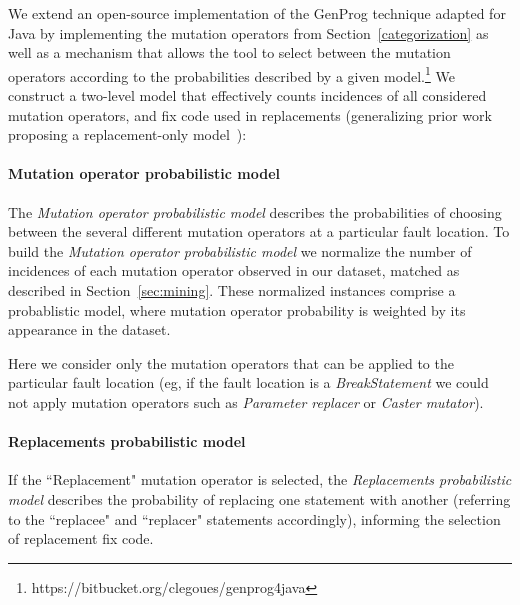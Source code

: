 \documentclass[conference]{IEEEtran}
\begin{document}
We extend an open-source implementation of the GenProg technique adapted for Java
by implementing the mutation operators from
Section~\ref{categorization} as well as a mechanism that allows the tool to
select between the mutation operators according to the probabilities described by
a given model.\footnote{https://bitbucket.org/clegoues/genprog4java}  We construct a two-level model that effectively counts incidences of all considered
mutation operators, and fix code used in replacements  (generalizing prior work
proposing a replacement-only model~\cite{Soto15}):

\paragraph{Mutation operator probabilistic model}
The \textit{Mutation operator probabilistic model} 
describes the probabilities of choosing between the several different mutation 
operators at a particular fault location.
%
To build the \textit{Mutation operator probabilistic model} 
we normalize the number of incidences of each mutation operator observed in our
dataset, matched as described in Section~\ref{sec:mining}.  These normalized
instances comprise a probablistic model, where mutation operator probability is
weighted by its appearance in the dataset.  

Here we consider only the mutation operators that can be applied to the particular fault location (eg, if the fault location is a \emph{BreakStatement} we could not apply mutation operators such as \emph{Parameter replacer} or \emph{Caster mutator}).

\paragraph{Replacements probabilistic model}
If the ``Replacement" mutation operator is 
selected, the \textit{Replacements probabilistic model} describes the probability of replacing one statement with
another  (referring to the 
``replacee" and ``replacer" statements accordingly), informing the selection of replacement fix code.
\end{document}
